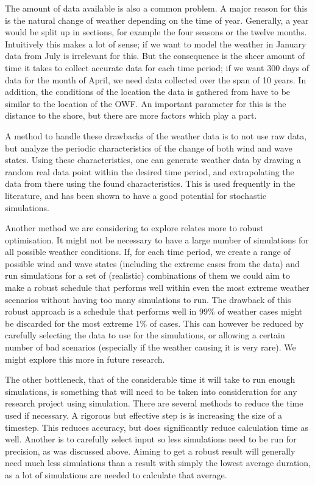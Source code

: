 \documentclass[a4paper,12pt]{article}
\begin{document}
The amount of data available is also a common problem. A major reason for this is the natural change of weather depending on the time of year. Generally, a year would be split up in sections, for example the four seasons or the twelve months. Intuitively this makes a lot of sense; if we want to model the weather in January data from July is irrelevant for this. But the consequence is the sheer amount of time it takes to collect accurate data for each time period; if we want 300 days of data for the month of April, we need data collected over the span of 10 years. In addition, the conditions of the location the data is gathered from have to be similar to the location of the OWF. An important parameter for this is the distance to the shore, but there are more factors which play a part. 

A method to handle these drawbacks of the weather data is to not use raw data, but analyze the periodic characteristics of the change of both wind and wave states. Using these characteristics, one can generate weather data by drawing a random real data point within the desired time period, and extrapolating the data from there using the found characteristics. This is used frequently in the literature, and has been shown to have a good potential for stochastic simulations. 

Another method we are considering to explore relates more to robust optimisation. It might not be necessary to have a large number of simulations for all possible weather conditions. If, for each time period, we create a range of possible wind and wave states (including the extreme cases from the data) and run simulations for a set of (realistic) combinations of them we could aim to make a robust schedule that performs well within even the most extreme weather scenarios without having too many simulations to run. The drawback of this robust approach is a schedule that performs well in 99\% of weather cases might be discarded for the most extreme 1\% of cases. This can however be reduced by carefully selecting the data to use for the simulations, or allowing a certain number of bad scenarios (especially if the weather causing it is very rare). We might explore this more in future research. 


\bigskip

The other bottleneck, that of the considerable time it will take to run enough simulations, is something that will need to be taken into consideration for any research project using simulation. There are several methods to reduce the time used if necessary. A rigorous but effective step is is increasing the size of a timestep. This reduces accuracy, but does significantly reduce calculation time as well. Another is to carefully select input so less simulations need to be run for precision, as was discussed above. Aiming to get a robust result will generally need much less simulations than a result with simply the lowest average duration, as a lot of simulations are needed to calculate that average. 
\end{document}
